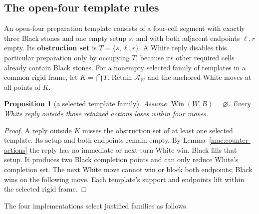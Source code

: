\documentclass[11pt]{article}
\newtheorem{proposition}[theorem]{Proposition}
\theoremstyle{definition}
\theoremstyle{remark}
\newcommand{\Win}{\operatorname{Win}}
\begin{document}
\subsection{The open-four template rules}

An open-four preparation template consists of a four-cell segment with exactly three Black stones and one empty setup \(s\), and with both adjacent endpoints \(\ell,r\) empty. Its \textbf{obstruction set} is \(T=\{s,\ell,r\}\). A White reply disables this particular preparation only by occupying \(T\), because its other required cells already contain Black stones. For a nonempty selected family of templates in a common rigid frame, let \(K=\bigcap T\). Retain \(\mathcal A_W\) and the anchored White moves at all points of \(K\).

\begin{proposition}[a selected template family]\label{mac:template-family}
Assume \(\Win(W,B)=\varnothing\). Every White reply outside those retained actions loses within four moves.

\end{proposition}
\begin{proof}
A reply outside \(K\) misses the obstruction set of at least one selected template. Its setup and both endpoints remain empty. By Lemma~\ref{mac:counter-actions} the reply has no immediate or next-turn White win. Black fills that setup. It produces two Black completion points and can only reduce White's completion set. The next White move cannot win or block both endpoints; Black wins on the following move. Each template's support and endpoints lift within the selected rigid frame. 
\end{proof}

The four implementations select justified families as follows.
\end{document}
